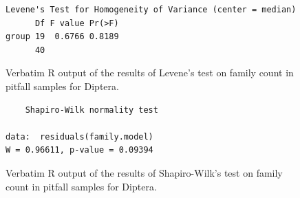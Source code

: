 \documentclass[10pt,letterpaper,twocolumn]{article}
\begin{document}
\begin{figure}[h]
	\lstset{numbers=left}
	\lstset{xleftmargin=5mm,framexleftmargin=5mm}
	\begin{lstlisting}
Levene's Test for Homogeneity of Variance (center = median)
      Df F value Pr(>F)
group 19  0.6766 0.8189
      40               
	\end{lstlisting}
	\caption{Verbatim R output of the results of Levene's test on family count in pitfall samples for Diptera.}
	\label{fig:pitfall_diptera_family_levene}
	\smallskip
	\nointerlineskip
	\hrulefill
\end{figure}

\begin{figure}[h]
	\lstset{numbers=left}
	\lstset{xleftmargin=5mm,framexleftmargin=5mm}
	\begin{lstlisting}
	Shapiro-Wilk normality test

data:  residuals(family.model)
W = 0.96611, p-value = 0.09394
	\end{lstlisting}
	\caption{Verbatim R output of the results of Shapiro-Wilk's test on family count in pitfall samples for Diptera.}
	\label{fig:pitfall_diptera_family_shapiro}
	\smallskip
	\nointerlineskip
	\hrulefill
\end{figure}
\end{document}
